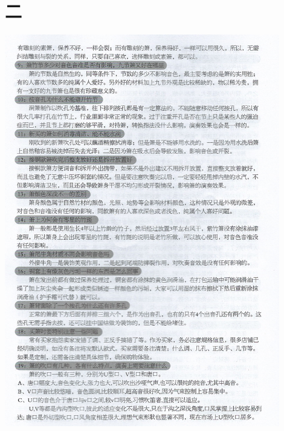 \documentclass[cn,pad,chinese,chinesefont=nofont]{elegantbook}
\begin{document}
\section{二}
\includegraphics[width=0.9\textwidth]{dongxiao/Scan 21.jpeg}
\end{document}
